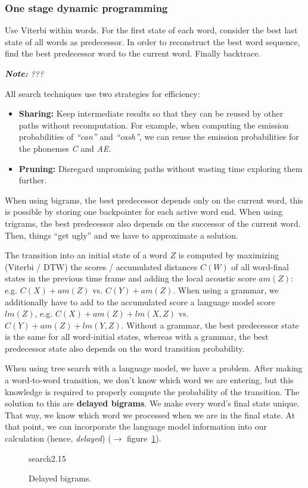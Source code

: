 \documentclass[11pt]{article}
\begin{document}
\subsubsection{One stage dynamic programming}
Use Viterbi within words. For the first state of each word, consider the best last state of all words as predecessor. In order to reconstruct the best word sequence, find the best predecessor word to the current word. Finally backtrace.

\textit{\textbf{Note:} ???}

All search techniques use two strategies for efficiency:
\begin{itemize}
    \item \textbf{Sharing:} Keep intermediate results so that they can be reused by other paths without recomputation. For example, when computing the emission probabilities of \textit{``can''} and \textit{``cash''}, we can reuse the emission probabilities for the phonemes \textit{C} and \textit{AE}.
    \item \textbf{Pruning:} Disregard unpromising paths without wasting time exploring them further.
\end{itemize}

When using bigrams, the best predecessor depends only on the current word, this is possible by storing one backpointer for each active word end. When using trigrams, the best predecessor also depends on the successor of the current word. Then, things ``get ugly'' and we have to approximate a solution.

The transition into an initial state of a word $Z$ is computed by maximizing (Viterbi / DTW) the scores / accumulated distances $C(W)$ of all word-final states in the previous time frame and adding the local acoustic score $am(Z)$: e.g. $C(X) + am(Z)$ vs. $C(Y) + am(Z)$. When using a grammar, we additionally have to add to the accumulated score a language model score $lm(Z)$, e.g. $C(X) + am(Z) + lm(X, Z)$ vs. $C(Y) + am(Z) + lm(Y,Z)$. Without a grammar, the best predecessor state is the same for all word-initial states, whereas with a grammar, the best predecessor state also depends on the word transition probability.

\vspace{10pt}

When using tree search with a language model, we have a problem. After making a word-to-word transition, we don't know which word we are entering, but this knowledge is required to properly compute the probability of the transition. The solution to this are \textbf{delayed bigrams}. We make every word's final state unique. That way, we know which word we processed when we are in the final state. At that point, we can incorporate the language model information into our calculation (hence,
\textit{delayed}) ($\to$ figure~\ref{fig:delayedBigrams}).
\begin{figure}[htb]
    \begin{minipage}{\linewidth}
        \vspace{4cm}
        \hfill \scriptsize search2.15
    \end{minipage}
    \caption{\label{fig:delayedBigrams} Delayed bigrams.}
\end{figure}
\end{document}
